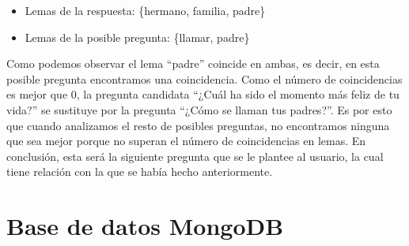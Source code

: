 \begin{itemize}
	\item[] Lemas de la respuesta: \hspace{2cm} \{hermano, familia, padre\} 
	\item[] Lemas de la posible pregunta: \hspace{0.8cm} \{llamar, padre\}
\end{itemize}

Como podemos observar el lema ``padre'' coincide en ambas, es decir, en esta posible pregunta encontramos una coincidencia. Como el número de coincidencias es mejor que 0, la pregunta candidata ``¿Cuál ha sido el momento más feliz de tu vida?'' se sustituye por la pregunta ``¿Cómo se llaman tus padres?''. Es por esto que cuando analizamos el resto de posibles preguntas, no encontramos ninguna que sea mejor porque no superan el número de coincidencias en lemas. En conclusión, esta será la siguiente pregunta que se le plantee al usuario, la cual tiene relación con la que se había hecho anteriormente. 

\section{Base de datos MongoDB}